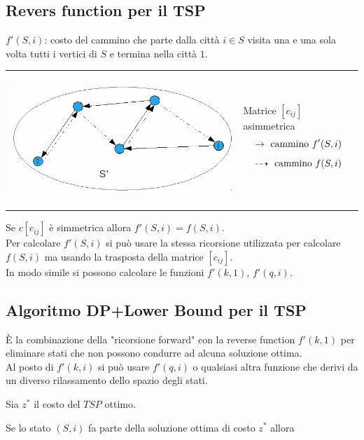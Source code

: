 \subsection{Revers function per il TSP}
$f'(S,i)$: costo del cammino che parte dalla città $i\in S$ visita una e una sola volta tutti i vertici di $S$ e termina nella città $1$.
\begin{table}[!h]
	\begin{tabular}{m{11cm} m{5cm}}
		\includegraphics[height=5cm]{images/graph49.png} & 
		Matrice $[c_{ij}]$ asimmetrica
		\begin{equation*}
			\rightarrow\textnormal{ cammino }f'(S,i)
		\end{equation*}
		\begin{equation*}
			\dashrightarrow\textnormal{ cammino }f(S,i)
		\end{equation*}
	\end{tabular}
\end{table}
Se $c[c_{ij}]$ è simmetrica allora $f'(S,i)=f(S,i)$.\\
Per calcolare $f'(S,i)$ si può usare la stessa ricorsione utilizzata per calcolare $f(S,i)$ ma usando la trasposta della matrice $[c_{ij}]$.\\
In modo simile si possono calcolare le funzioni $f'(k,1)$, $f'(q,i)$.

\subsection{Algoritmo DP+Lower Bound per il TSP}
È la combinazione della "ricorsione forward" con la reverse function $f'(k,1)$ per eliminare stati che non possono condurre ad alcuna soluzione ottima.\\
Al posto di $f'(k,i)$ si può usare $f'(q,i)$ o qualsiasi altra funzione che derivi da un diverso rilassamento dello spazio degli stati.

Sia $z^{*}$ il costo del $TSP$ ottimo.

Se lo stato $(S,i)$ fa parte della soluzione ottima di costo $z^{*}$ allora

